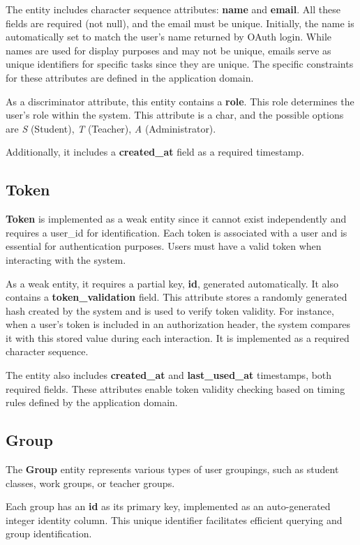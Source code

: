 The entity includes character sequence attributes: \textbf{name} and \textbf{email}. All these fields are required (not null), and the email must be unique. Initially, the name is automatically set to match the user's name returned by OAuth login. While names are used for display purposes and may not be unique, emails serve as unique identifiers for specific tasks since they are unique. The specific constraints for these attributes are defined in the application domain.

As a discriminator attribute, this entity contains a \textbf{role}. This role determines the user's role within the system. This attribute is a char, and the possible options are \textit{S} (Student), \textit{T} (Teacher), \textit{A} (Administrator).

Additionally, it includes a \textbf{created\_at} field as a required timestamp.

\subsection{Token}
\textbf{Token} is implemented as a weak entity since it cannot exist independently and requires a user\_id for identification. Each token is associated with a user and is essential for authentication purposes. Users must have a valid token when interacting with the system.

As a weak entity, it requires a partial key, \textbf{id}, generated automatically. It also contains a \textbf{token\_validation} field. This attribute stores a randomly generated hash created by the system and is used to verify token validity. For instance, when a user's token is included in an authorization header, the system compares it with this stored value during each interaction. It is implemented as a required character sequence.

The entity also includes \textbf{created\_at} and \textbf{last\_used\_at} timestamps, both required fields. These attributes enable token validity checking based on timing rules defined by the application domain.

\subsection{Group}
The \textbf{Group} entity represents various types of user groupings, such as student classes, work groups, or teacher groups.

Each group has an \textbf{id} as its primary key, implemented as an auto-generated integer identity column. This unique identifier facilitates efficient querying and group identification.

